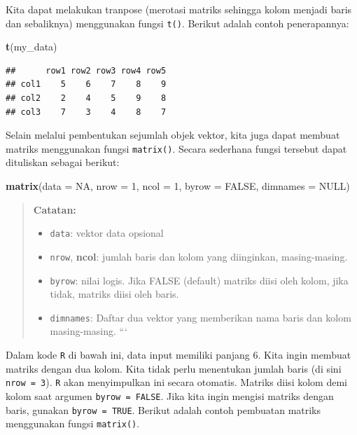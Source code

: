 \documentclass[]{book}
\newenvironment{Shaded}{\begin{snugshade}}{\end{snugshade}}
\newcommand{\DataTypeTok}[1]{\textcolor[rgb]{0.13,0.29,0.53}{#1}}
\newcommand{\DecValTok}[1]{\textcolor[rgb]{0.00,0.00,0.81}{#1}}
\newcommand{\KeywordTok}[1]{\textcolor[rgb]{0.13,0.29,0.53}{\textbf{#1}}}
\newcommand{\NormalTok}[1]{#1}
\newcommand{\OtherTok}[1]{\textcolor[rgb]{0.56,0.35,0.01}{#1}}
\providecommand{\tightlist}{%
  \setlength{\itemsep}{0pt}\setlength{\parskip}{0pt}}
\theoremstyle{definition}
\theoremstyle{definition}
\theoremstyle{definition}
\theoremstyle{remark}
\begin{document}
Kita dapat melakukan tranpose (merotasi matriks sehingga kolom menjadi baris dan sebaliknya) menggunakan fungsi \texttt{t()}. Berikut adalah contoh penerapannya:

\begin{Shaded}
\begin{Highlighting}[]
\KeywordTok{t}\NormalTok{(my_data)}
\end{Highlighting}
\end{Shaded}

\begin{verbatim}
##      row1 row2 row3 row4 row5
## col1    5    6    7    8    9
## col2    2    4    5    9    8
## col3    7    3    4    8    7
\end{verbatim}

Selain melalui pembentukan sejumlah objek vektor, kita juga dapat membuat matriks menggunakan fungsi \texttt{matrix()}. Secara sederhana fungsi tersebut dapat dituliskan sebagai berikut:

\begin{Shaded}
\begin{Highlighting}[]
\KeywordTok{matrix}\NormalTok{(}\DataTypeTok{data =} \OtherTok{NA}\NormalTok{, }\DataTypeTok{nrow =} \DecValTok{1}\NormalTok{, }\DataTypeTok{ncol =} \DecValTok{1}\NormalTok{, }\DataTypeTok{byrow =} \OtherTok{FALSE}\NormalTok{,}
       \DataTypeTok{dimnames =} \OtherTok{NULL}\NormalTok{)}
\end{Highlighting}
\end{Shaded}

\begin{quote}
\textbf{Catatan:}

\begin{itemize}
\tightlist
\item
  \texttt{data}: vektor data opsional
\item
  \texttt{nrow}, \textbf{ncol}: jumlah baris dan kolom yang diinginkan, masing-masing.
\item
  \texttt{byrow}: nilai logis. Jika FALSE (default) matriks diisi oleh kolom, jika tidak, matriks diisi oleh baris.
\item
  \texttt{dimnames}: Daftar dua vektor yang memberikan nama baris dan kolom masing-masing.
  ```
\end{itemize}
\end{quote}

Dalam kode \texttt{R} di bawah ini, data input memiliki panjang 6. Kita ingin membuat matriks dengan dua kolom. Kita tidak perlu menentukan jumlah baris (di sini \texttt{nrow\ =\ 3}). \texttt{R} akan menyimpulkan ini secara otomatis. Matriks diisi kolom demi kolom saat argumen \texttt{byrow\ =\ FALSE}. Jika kita ingin mengisi matriks dengan baris, gunakan \texttt{byrow\ =\ TRUE}. Berikut adalah contoh pembuatan matriks menggunakan fungsi \texttt{matrix()}.
\end{document}
